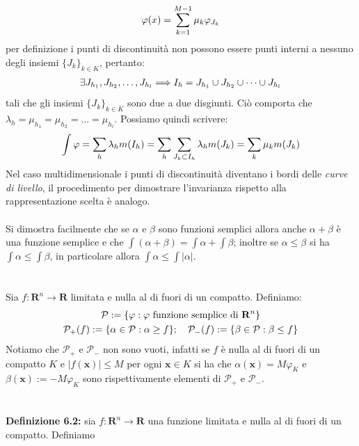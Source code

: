 \documentclass{article}
\begin{document}
\begin{align}
    \varphi(x) = \sum_{k = 1}^{M - 1} \mu_k \varphi_{J_k} \notag
\end{align}
per definizione i punti di discontinuità non possono essere punti interni a nessuno degli insiemi $\{ J_k \}_{k \in K}$, pertanto:
\begin{align}
    \exists J_{h_1}, J_{h_2}, \dots, J_{h_l} \Longrightarrow I_h = J_{h_1} \cup J_{h_2} \cup \dots \cup J_{h_l} \notag
\end{align}
tali che gli insiemi $\{ J_k \}_{k \in K}$ sono due a due disgiunti. Ciò comporta che $\lambda_h = \mu_{h_1} = \mu_{h_2} = \dots = \mu_{h_l}$. Possiamo quindi scrivere:
\begin{align}
    \int \varphi = \sum_h \lambda_h m(I_h) = \sum_h \sum_{J_k \subset I_h} \lambda_h m(J_k) = \sum_k \mu_k m(J_k) \notag
\end{align}
Nel caso multidimensionale i punti di discontinuità diventano i bordi delle \textit{curve di livello}, il procedimento per dimostrare l'invarianza rispetto alla rappresentazione scelta è analogo. \\ \\
Si dimostra facilmente che se $\alpha$ e $\beta$ sono funzioni semplici allora anche $\alpha + \beta$ è una funzione semplice e che $\int (\alpha + \beta) = \int \alpha + \int \beta$; inoltre se $\alpha \leq \beta$ si ha $\int \alpha \leq \int \beta$, in particolare allora $\int \alpha \leq \int |\alpha|$. \\ \\ \\
Sia $f : \mathbf{R}^n \longrightarrow \mathbf{R}$ limitata e nulla al di fuori di un compatto. Definiamo:
\begin{gather}
    \mathcal{P} := \{ \varphi : \varphi \text{ funzione semplice di } \mathbf{R}^n \} \notag \\
    \mathcal{P}_+(f) := \{ \alpha \in \mathcal{P} : \alpha \geq f \}; \quad \mathcal{P}_-(f) := \{ \beta \in \mathcal{P} : \beta \leq f \} \notag
\end{gather}
Notiamo che $\mathcal{P}_+$ e $\mathcal{P}_-$ non sono vuoti, infatti se $f$ è nulla al di fuori di un compatto $K$ e $|f(\mathbf{x})| \leq M$ per ogni $\mathbf{x} \in K$ si ha che $\alpha(\mathbf{x}) = M\varphi_{K}$ e $\beta(\mathbf{x}) := -M\varphi_{K}$ sono rispettivamente elementi di $\mathcal{P}_+$ e $\mathcal{P}_-$. \\ \\ \\
\textbf{Definizione 6.2:} sia $f : \mathbf{R}^n \longrightarrow \mathbf{R}$ una funzione limitata e nulla al di fuori di un compatto. Definiamo
\end{document}
